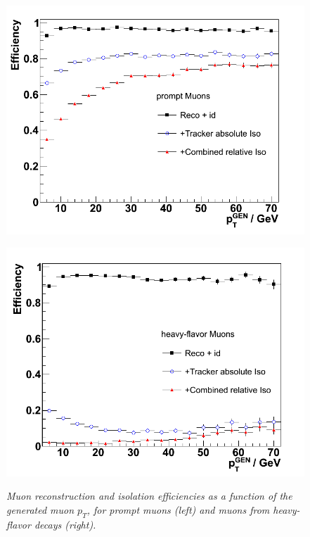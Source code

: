 \begin{figure}[h!]
\begin{minipage}[b]{0.5\linewidth}
\centering
{\label{fig:lm1_cor}\includegraphics[scale=0.32]{./plots/prompt_muon_eff.png}}
\end{minipage}
\begin{minipage}[b]{0.5\linewidth}
\centering
{\label{fig:qcd_cor}\includegraphics[scale=0.32]{./plots/hadron_muon_eff.png}}
\end{minipage}
\caption{\textit{Muon reconstruction and isolation efficiencies as a function of the generated muon $p_{T}$, for prompt muons (left) and muons from heavy-flavor decays (right). } }
\label{fig:muon-eff}
\end{figure}

